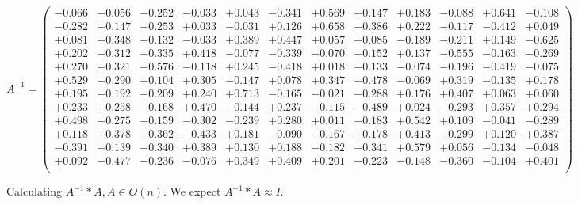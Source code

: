 \documentclass[9pt]{article}
\theoremstyle{plain}
\theoremstyle{definition}
\theoremstyle{remark}
\numberwithin{equation}{section}
\begin{document}
$A^{-1} = \left(
\begin{array}{
cccccccccccc}
-0.066 & -0.056 & -0.252 & -0.033 & +0.043 & -0.341 & +0.569 & +0.147 & +0.183 & -0.088 & +0.641 & -0.108 \\
-0.282 & +0.147 & +0.253 & +0.033 & -0.031 & +0.126 & +0.658 & -0.386 & +0.222 & -0.117 & -0.412 & +0.049 \\
+0.081 & +0.348 & +0.132 & -0.033 & +0.389 & +0.447 & +0.057 & +0.085 & -0.189 & -0.211 & +0.149 & -0.625 \\
+0.202 & -0.312 & +0.335 & +0.418 & -0.077 & -0.339 & -0.070 & +0.152 & +0.137 & -0.555 & -0.163 & -0.269 \\
+0.270 & +0.321 & -0.576 & -0.118 & +0.245 & -0.418 & +0.018 & -0.133 & -0.074 & -0.196 & -0.419 & -0.075 \\
+0.529 & +0.290 & +0.104 & +0.305 & -0.147 & +0.078 & +0.347 & +0.478 & -0.069 & +0.319 & -0.135 & +0.178 \\
+0.195 & -0.192 & +0.209 & +0.240 & +0.713 & -0.165 & -0.021 & -0.288 & +0.176 & +0.407 & +0.063 & +0.060 \\
+0.233 & +0.258 & -0.168 & +0.470 & -0.144 & +0.237 & -0.115 & -0.489 & +0.024 & -0.293 & +0.357 & +0.294 \\
+0.498 & -0.275 & -0.159 & -0.302 & -0.239 & +0.280 & +0.011 & -0.183 & +0.542 & +0.109 & -0.041 & -0.289 \\
+0.118 & +0.378 & +0.362 & -0.433 & +0.181 & -0.090 & -0.167 & +0.178 & +0.413 & -0.299 & +0.120 & +0.387 \\
-0.391 & +0.139 & -0.340 & +0.389 & +0.130 & +0.188 & -0.182 & +0.341 & +0.579 & +0.056 & -0.134 & -0.048 \\
+0.092 & -0.477 & -0.236 & -0.076 & +0.349 & +0.409 & +0.201 & +0.223 & -0.148 & -0.360 & -0.104 & +0.401 \\
\end{array}
\right)$ \newline 

Calculating $A^{-1} *A  ,  A \in O(n)$.   We expect $A^{-1} *A  \approx I$. 
\end{document}

